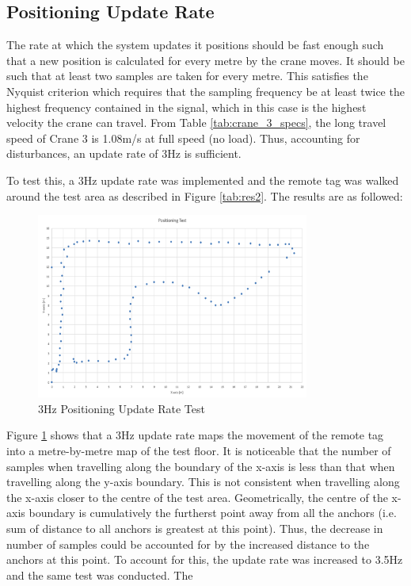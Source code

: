 \documentclass[12pt, a4paper]{article}
\begin{document}
\subsection{Positioning Update Rate}
The rate at which the system updates it positions should be fast enough such that a new position is calculated for every metre by the crane moves.
It should be such that at least two samples are taken for every metre. This satisfies the Nyquist criterion which requires that the sampling frequency
be at least twice the highest frequency contained in the signal, which in this case is the highest velocity the crane can travel. From Table \ref{tab:crane_3_specs}, the
long travel speed of Crane 3 is 1.08m/s at full speed (no load). Thus, accounting for disturbances, an update rate of 3Hz is sufficient.

To test this, a 3Hz update rate was implemented and the remote tag was walked around the test area as described in Figure 
\ref{tab:res2}. The results are as followed:
\begin{figure}[H]
    \centering
    \includegraphics[width=0.8\textwidth]{update1.png}
    \caption{3Hz Positioning Update Rate Test}
    \label{fig:3hz}
\end{figure}
Figure \ref{fig:3hz} shows that a 3Hz update rate maps the movement of the remote tag into a metre-by-metre map of the test floor. It is noticeable
that the number of samples when travelling along the boundary of the x-axis is less than that when travelling along the y-axis boundary. This is not consistent 
when travelling along the x-axis closer to the centre of the test area. Geometrically, the centre of the x-axis boundary is cumulatively the furtherst
point away from all the anchors (i.e. sum of distance to all anchors is greatest at this point). Thus, the decrease in number of samples could be accounted
for by the increased distance to the anchors at this point. To account for this, the update rate was increased to 3.5Hz and the same test was conducted. The
\end{document}
